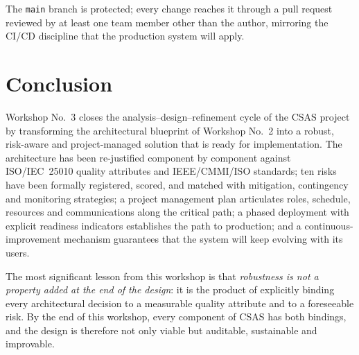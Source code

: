 \documentclass[conference,a4paper,10pt]{IEEEtran}
\begin{document}
The \texttt{main} branch is protected; every change reaches it through a
pull request reviewed by at least one team member other than the author,
mirroring the CI/CD discipline that the production system will apply.

\section{Conclusion}
\label{sec:conclusion}

Workshop No.\ 3 closes the analysis--design--refinement cycle of the CSAS
project by transforming the architectural blueprint of Workshop No.\ 2
into a robust, risk-aware and project-managed solution that is ready for
implementation. The architecture has been re-justified component by
component against ISO/IEC~25010 quality attributes and IEEE/CMMI/ISO
standards; ten risks have been formally registered, scored, and matched
with mitigation, contingency and monitoring strategies; a project
management plan articulates roles, schedule, resources and communications
along the critical path; a phased deployment with explicit readiness
indicators establishes the path to production; and a continuous-improvement
mechanism guarantees that the system will keep evolving with its users.

The most significant lesson from this workshop is that \emph{robustness
is not a property added at the end of the design}: it is the product of
explicitly binding every architectural decision to a measurable quality
attribute and to a foreseeable risk. By the end of this workshop, every
component of CSAS has both bindings, and the design is therefore not only
viable but auditable, sustainable and improvable.
\end{document}
